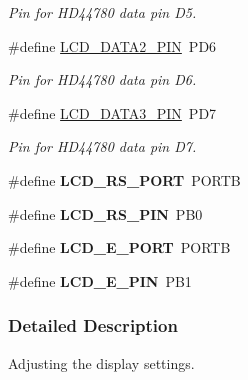 \begin{DoxyCompactItemize}
\begin{DoxyCompactList}\small\item\em Pin for H\+D44780 data pin D5. \end{DoxyCompactList}\item 
\#define \hyperlink{a00007_ga7f3d53627337f6535cc8daa35876510a}{L\+C\+D\+\_\+\+D\+A\+T\+A2\+\_\+\+P\+IN}~P\+D6\hypertarget{a00007_ga7f3d53627337f6535cc8daa35876510a}{}\label{a00007_ga7f3d53627337f6535cc8daa35876510a}

\begin{DoxyCompactList}\small\item\em Pin for H\+D44780 data pin D6. \end{DoxyCompactList}\item 
\#define \hyperlink{a00007_ga54032ce0050853e181f879b69fec4370}{L\+C\+D\+\_\+\+D\+A\+T\+A3\+\_\+\+P\+IN}~P\+D7\hypertarget{a00007_ga54032ce0050853e181f879b69fec4370}{}\label{a00007_ga54032ce0050853e181f879b69fec4370}

\begin{DoxyCompactList}\small\item\em Pin for H\+D44780 data pin D7. \end{DoxyCompactList}\item 
\#define {\bfseries L\+C\+D\+\_\+\+R\+S\+\_\+\+P\+O\+RT}~P\+O\+R\+TB\hypertarget{a00007_gac5be2a22727fd9ca349e1c9bcbfbcd47}{}\label{a00007_gac5be2a22727fd9ca349e1c9bcbfbcd47}

\item 
\#define {\bfseries L\+C\+D\+\_\+\+R\+S\+\_\+\+P\+IN}~P\+B0\hypertarget{a00007_gae5c0a0a5750f3aaea06083e3a4a31f5d}{}\label{a00007_gae5c0a0a5750f3aaea06083e3a4a31f5d}

\item 
\#define {\bfseries L\+C\+D\+\_\+\+E\+\_\+\+P\+O\+RT}~P\+O\+R\+TB\hypertarget{a00007_gaf97f97ff3832d1289bbcb471090ea297}{}\label{a00007_gaf97f97ff3832d1289bbcb471090ea297}

\item 
\#define {\bfseries L\+C\+D\+\_\+\+E\+\_\+\+P\+IN}~P\+B1\hypertarget{a00007_gae644d776392a8d47899d9910c2b8feb6}{}\label{a00007_gae644d776392a8d47899d9910c2b8feb6}

\end{DoxyCompactItemize}


\subsubsection{Detailed Description}
Adjusting the display settings. 


